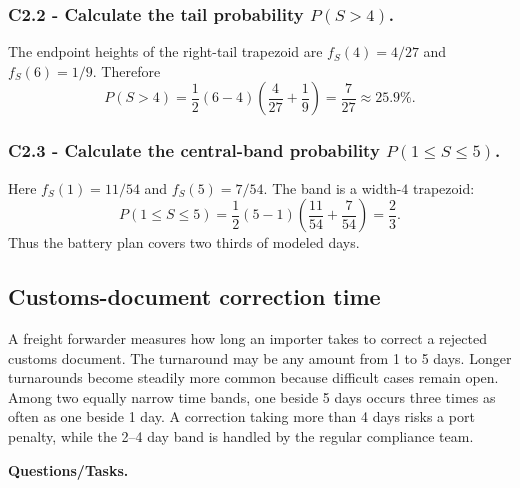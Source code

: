 \subsubsection*{C2.2 - Calculate the tail probability $P(S>4)$.}
\label{subsec:c2-linear-microgrid-b}
The endpoint heights of the right-tail trapezoid are
$f_S(4)=4/27$ and $f_S(6)=1/9$.  Therefore
\[
 P(S>4)=\frac12(6-4)\left(\frac4{27}+\frac19\right)
 =\frac7{27}\approx25.9\%.
\]

\subsubsection*{C2.3 - Calculate the central-band probability
$P(1\le S\le5)$.}
\label{subsec:c2-linear-microgrid-c}
Here $f_S(1)=11/54$ and $f_S(5)=7/54$.  The band is a width-$4$
trapezoid:
\[
 P(1\le S\le5)=\frac12(5-1)\left(\frac{11}{54}+\frac7{54}\right)
 =\frac23.
\]
Thus the battery plan covers two thirds of modeled days.

\subsection{Customs-document correction time}\label{sec:c2-linear-customs}
A freight forwarder measures how long an importer takes to correct a rejected
customs document.  The turnaround may be any amount from 1 to 5 days.  Longer
turnarounds become steadily more common because difficult cases remain open.
Among two equally narrow time bands, one beside 5 days occurs three times as
often as one beside 1 day.  A correction taking more than 4 days risks a port
penalty, while the 2--4 day band is handled by the regular compliance team.

\begingroup{}
\endgroup

\textbf{Questions/Tasks.}
\begin{enumerate}
\end{enumerate}

